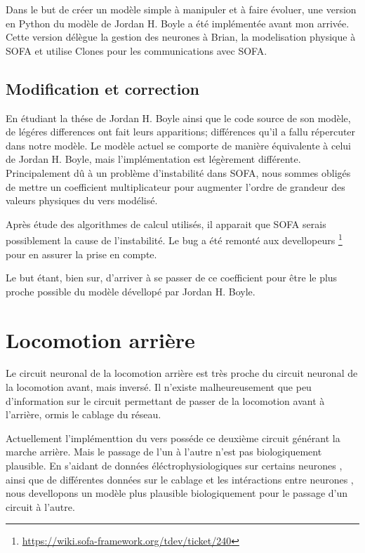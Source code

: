 Dans le but de créer un modèle simple à manipuler et à faire évoluer, une version en Python du
modèle de Jordan H. Boyle a été implémentée avant mon arrivée. Cette version délègue la gestion
des neurones à Brian, la modelisation physique à SOFA et utilise Clones pour les communications
avec SOFA.

\subsection{Modification et correction} %
\label{sub:Modification et correction}

En étudiant la thése de Jordan H. Boyle ainsi que le code source de son modèle, de légéres differences
ont fait leurs apparitions; différences qu'il a fallu répercuter dans notre modèle.
Le modèle actuel se comporte de manière équivalente à celui de Jordan H. Boyle, mais l'implémentation
est légèrement différente. Principalement dû à un problème d'instabilité dans SOFA, nous sommes obligés
de mettre un coefficient multiplicateur pour augmenter l'ordre de grandeur des valeurs physiques du vers
modélisé.

Après étude des algorithmes de calcul utilisés, il apparait que SOFA serais possiblement la cause de
l'instabilité. Le bug a été remonté aux devellopeurs
\footnote{\url{https://wiki.sofa-framework.org/tdev/ticket/240}} pour en assurer la prise en compte.

Le but étant, bien sur, d'arriver à se passer de ce coefficient pour être le plus proche possible
du modèle dévellopé par Jordan H. Boyle.



\section{Locomotion arrière} %
\label{sec:Locomotion arrière}

Le circuit neuronal de la locomotion arrière est très proche du circuit neuronal de la locomotion
avant, mais inversé\cite{Boyle2009}. Il n'existe malheureusement que peu d'information sur le circuit
permettant de passer de la locomotion avant à l'arrière, ormis le cablage du réseau.

Actuellement l'implémenttion du vers posséde ce deuxième circuit générant la marche arrière. Mais
le passage de l'un à l'autre n'est pas biologiquement plausible. En s'aidant de données
éléctrophysiologiques sur certains neurones \cite{Mellem2008a,Lockery2009}, ainsi que de différentes
données sur le cablage et les intéractions entre neurones
\cite{Chalfie1985,Gray2005,Chen2006,Varshney2011,Leifer2011}, nous devellopons un modèle plus
plausible biologiquement pour le passage d'un circuit à l'autre.

